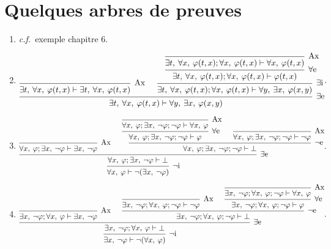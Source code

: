 \section{Quelques arbres de preuves}

\begin{enumerate}
	\item \textit{c.f.}\ exemple chapitre 6.
	\item
		\[
			\begin{prooftree}
				\infer 0[Ax]{\exists t,\: \forall x,\: \varphi(t, x) \vdash \exists t,\: \forall x,\: \varphi(t,x)}
				\infer 0[Ax]{\exists t,\: \forall x,\: \varphi(t, x);\forall x,\: \varphi(t,x) \vdash \forall x,\: \varphi(t,x)}
				\infer 1[$\forall$e]{\exists t,\: \forall x,\: \varphi(t, x) ; \forall x,\: \varphi(t,x) \vdash \varphi(t,x)}
				\infer 1[$\exists$i]{\exists t,\: \forall x,\: \varphi(t, x);\forall x,\: \varphi(t,x) \vdash \forall y,\: \exists x,\: \varphi(x,y)}
				\infer 2[$\exists$e]{\exists t,\: \forall x,\: \varphi(t, x) \vdash \forall y,\: \exists x,\: \varphi(x,y)}
			\end{prooftree}
		.\] 
	\item
		\[
			\begin{prooftree}
				\infer 0[Ax]{\forall x,\: \varphi ; \exists x,\: \lnot \varphi \vdash \exists x,\: \lnot \varphi}
				\infer 0[Ax]{\forall x,\: \varphi ; \exists x,\: \lnot \varphi;\lnot \varphi \vdash \forall x,\: \varphi}
				\infer 1[$\forall$e]{\forall x,\: \varphi ; \exists x,\: \lnot \varphi;\lnot \varphi \vdash \varphi}
				\infer 0[Ax]{\forall x,\: \varphi ; \exists x,\: \lnot \varphi;\lnot \varphi \vdash \lnot \varphi}
				\infer 2[$\lnot$e]{\forall x,\: \varphi ; \exists x,\: \lnot \varphi;\lnot \varphi \vdash \bot }
				\infer 2[$\exists$e]{\forall x,\: \varphi ; \exists x,\: \lnot \varphi \vdash \bot}
				\infer 1[$\lnot$i]{\forall x,\: \varphi \vdash \lnot (\exists x,\: \lnot \varphi)}
			\end{prooftree}
		.\]
	\item
		\[
			\begin{prooftree}
				\infer 0[Ax]{\exists x,\:\lnot \varphi ;\forall x,\:\varphi\vdash \exists x,\: \lnot \varphi}
				\infer 0[Ax]{\exists x,\:\lnot \varphi ;\forall x,\:\varphi;\lnot \varphi \vdash \lnot \varphi}
				\infer 0[Ax]{\exists x,\:\lnot \varphi ;\forall x,\:\varphi;\lnot \varphi \vdash \forall x,\: \varphi}
				\infer 1[$\forall$e]{\exists x,\:\lnot \varphi ;\forall x,\:\varphi;\lnot \varphi \vdash \varphi}
				\infer 2[$\lnot$e]{\exists x,\:\lnot \varphi ;\forall x,\:\varphi;\lnot \varphi \vdash \bot}
				\infer 2[$\exists$e]{\exists x,\:\lnot \varphi ;\forall x,\:\varphi\vdash\bot}
				\infer 1[$\lnot$i]{\exists x,\:\lnot \varphi \vdash \lnot (\forall x,\:\varphi)}
			\end{prooftree}
		.\] 
\end{enumerate}
